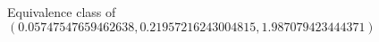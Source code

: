 \documentclass[preview]{standalone}
\begin{document}
\begin{center}
Equivalence class of $(0.05747547659462638, 0.21957216243004815, 1.987079423444371)$
\end{center}
\end{document}
